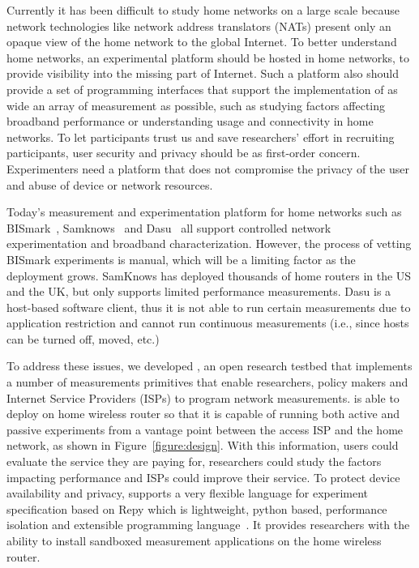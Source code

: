 {Currently it has been difficult to study home
  networks on a large scale because network technologies like network address translators (NATs) present only an opaque view of the home network to the global Internet. To better understand home networks, an experimental platform should be hosted in home networks, to provide visibility into the missing part of Internet.  Such a platform also should provide a set of programming interfaces that support the implementation of as wide an array of measurement as possible, such as studying factors affecting broadband performance or understanding usage and connectivity in home networks. To let participants trust us and save researchers' effort in recruiting participants, user security and privacy should be as first-order concern. Experimenters need a platform that does not compromise the privacy of the user and abuse of device or network resources.

Today's measurement and experimentation platform for home networks such as
BISmark~\cite{183951}, Samknows~\cite{samknows} and Dasu~\cite{
sanchez2014measurement} all support controlled network experimentation
and broadband characterization. However, the process of vetting BISmark
experiments is manual, which will be a limiting factor as the deployment
grows. SamKnows has deployed thousands of home routers in the US and the UK,
but only supports limited performance measurements. Dasu is a host-based
software client, thus it is not able to run certain measurements due to
application restriction and cannot run continuous measurements (i.e., since
hosts can be turned off, moved, etc.)

To address these issues, we developed \sysname, an open research testbed that implements a number of measurements primitives that enable researchers, policy makers and Internet Service Providers (ISPs) to program network measurements. \sysname is able to deploy on home wireless router so that it is capable of running both active and passive experiments from a vantage point between the access ISP and the home network, as shown in Figure~\ref{figure:design}. With this information, users could evaluate the service they are paying for, researchers could study the factors impacting performance and ISPs could improve their service. To protect device availability and privacy, \sysname supports a very flexible language for experiment specification based on Repy which is lightweight, python based, performance isolation and extensible programming language~\cite{cappos2010retaining}. It provides researchers with the ability to install sandboxed measurement applications on the home wireless router.

}
